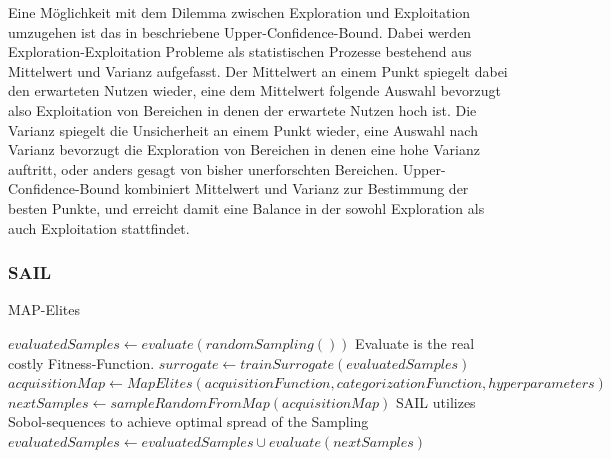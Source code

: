 Eine Möglichkeit mit dem Dilemma zwischen Exploration und Exploitation umzugehen ist das in \cite{Auer.2002} beschriebene Upper-Confidence-Bound. Dabei werden Exploration-Exploitation Probleme als statistischen Prozesse bestehend aus Mittelwert und Varianz aufgefasst.
Der Mittelwert an einem Punkt spiegelt dabei den erwarteten Nutzen wieder, eine dem Mittelwert folgende Auswahl bevorzugt also Exploitation von Bereichen in denen der erwartete Nutzen hoch ist.
Die Varianz spiegelt die Unsicherheit an einem Punkt wieder, eine Auswahl nach Varianz bevorzugt die Exploration von Bereichen in denen eine hohe Varianz auftritt, oder anders gesagt von bisher unerforschten Bereichen.
Upper-Confidence-Bound kombiniert Mittelwert und Varianz zur Bestimmung der besten Punkte, und erreicht damit eine Balance in der sowohl Exploration als auch Exploitation stattfindet.


\subsubsection{SAIL}

\begin{algorithm}
	\caption{MAP-Elites} \label{alg:mapElites}
	\begin{algorithmic}[1]
\State $evaluatedSamples \gets evaluate(randomSampling())$ \Comment Evaluate is the real costly Fitness-Function.
\Else
\State $surrogate \gets trainSurrogate(evaluatedSamples)$
\State $acquisitionMap \gets MapElites(acquisitionFunction,categorizationFunction,hyperparameters)$
\State $nextSamples \gets sampleRandomFromMap(acquisitionMap)$ \Comment SAIL utilizes Sobol-sequences to achieve optimal spread of the Sampling
\State $evaluatedSamples \gets evaluatedSamples \cup evaluate(nextSamples)$
\EndIf
			\EndWhile
		\EndProcedure
	\end{algorithmic}
\end{algorithm}

